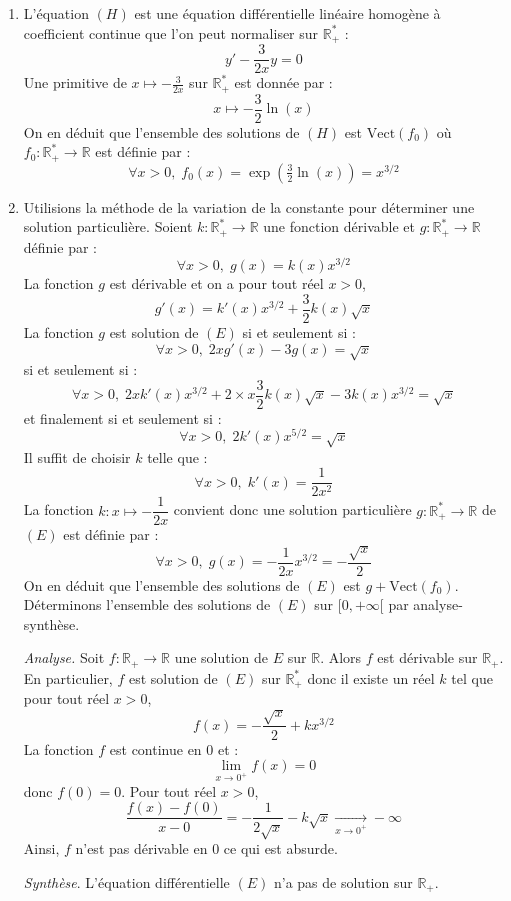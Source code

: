 \documentclass[a4paper,10pt]{report}
\begin{document}
\corr \begin{enumerate}
\item L'équation $(H)$ est une équation différentielle linéaire homogène à coefficient continue que l'on peut normaliser sur $\mathbb{R}_+^{*}$ :
$$ y' - \dfrac{3}{2x} y = 0$$
Une primitive de $x \mapsto -\tfrac{3}{2x}$ sur $\mathbb{R}_+^*$ est donnée par :
$$ x \mapsto - \dfrac{3}{2} \ln(x)$$
On en déduit que l'ensemble des solutions de $(H)$ est $\textrm{Vect}(f_0)$ où $f_0 : \mathbb{R}_+^* \rightarrow \mathbb{R}$ est définie par :
$$ \forall x>0, \; f_0(x) = \exp ( \tfrac{3}{2} \ln(x)) = x^{3/2}$$

\item Utilisions la méthode de la variation de la constante pour déterminer une solution particulière. Soient \newline $k : \mathbb{R}_+^* \rightarrow \mathbb{R}$ une fonction dérivable et $g : \mathbb{R}_+^* \rightarrow \mathbb{R}$ définie par :
$$ \forall x>0, \; g(x) = k(x) x^{3/2}$$
La fonction $g$ est dérivable et on a pour tout réel $x>0$,
$$ g'(x) = k'(x) x^{3/2} + \dfrac{3}{2} k(x) \sqrt{x}$$
La fonction $g$ est solution de $(E)$ si et seulement si :
$$ \forall x>0, \; 2xg'(x)-3g(x)=\sqrt{x}$$
si et seulement si :
$$ \forall x>0, \; 2x k'(x) x^{3/2} + 2 \times x \dfrac{3}{2} k(x) \sqrt{x} - 3 k(x) x^{3/2} = \sqrt{x}$$
et finalement si et seulement si :
$$  \forall x>0, \; 2k'(x) x^{5/2} = \sqrt{x}$$
Il suffit de choisir $k$ telle que :
$$ \forall x>0, \; k'(x) = \dfrac{1}{2x^2}$$
La fonction $k : x \mapsto - \dfrac{1}{2x}$ convient donc une solution particulière $g : \mathbb{R}_+^* \rightarrow \mathbb{R}$ de $(E)$ est définie par :
$$ \forall x>0, \; g(x) = - \dfrac{1}{2x} x^{3/2} =- \dfrac{\sqrt{x}}{2}$$
On en déduit que l'ensemble des solutions de $(E)$ est $g + \textrm{Vect}(f_0)$.
Déterminons l'ensemble des solutions de $(E)$ sur $[0, + \infty[$ par analyse-synthèse.

\medskip

\noindent \textit{Analyse.} Soit $f : \mathbb{R}_+ \rightarrow \mathbb{R}$ une solution de $E$ sur $\mathbb{R}$. Alors $f$ est dérivable sur $\mathbb{R}_+$. En particulier, $f$ est solution de $(E)$ sur $\mathbb{R}_+^{*}$ donc il existe un réel $k$ tel que pour tout réel $x>0$,
$$ f(x)= - \dfrac{\sqrt{x}}{2} + k x^{3/2}$$
La fonction $f$ est continue en $0$ et :
$$ \lim_{x \rightarrow 0^+} f(x) = 0$$
donc $f(0)=0$. Pour tout réel $x>0$,
$$ \dfrac{f(x)-f(0)}{x-0} =- \dfrac{1}{2\sqrt{x}} - k \sqrt{x} \underset{x \rightarrow 0^+}{\longrightarrow} - \infty$$
Ainsi, $f$ n'est pas dérivable en $0$ ce qui est absurde.

\medskip

\noindent \textit{Synthèse}. L'équation différentielle $(E)$ n'a pas de solution sur $\mathbb{R}_+$.
\end{enumerate}
\end{document}
